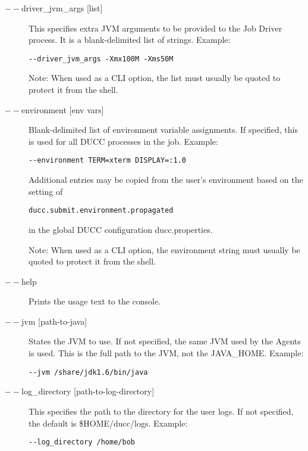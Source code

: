 \begin{description}
           \item[$--$driver\_jvm\_args {[list]} ]

             This specifies extra JVM arguments to be provided to the Job Driver process. It is a blank-delimited 
             list of strings. Example: 
             \begin{verbatim}
--driver_jvm_args -Xmx100M -Xms50M 
             \end{verbatim}

             Note: When used as a CLI option, the list must usually be
             quoted to protect it from the shell.

           \item[$--$environment {[env vars]}] Blank-delimited list of environment variable
             assignments. If specified, this is used for all DUCC processes in the job. Example:
\begin{verbatim}
--environment TERM=xterm DISPLAY=:1.0
\end{verbatim}
             
             Additional entries may be copied from the user's environment based on the setting of
\begin{verbatim}
ducc.submit.environment.propagated
\end{verbatim}
             in the global DUCC configuration ducc.properties.

             Note: When used as a CLI option, the environment string must usually be
             quoted to protect it from the shell.

           \item[$--$help ]

             Prints the usage text to the console. 

           \item[$--$jvm {[path-to-java]}  ]

             States the JVM to use. If not specified, the same JVM used by the Agents is used.  This is
             the full path to the JVM, not the JAVA\_HOME.
             Example: 
\begin{verbatim}
--jvm /share/jdk1.6/bin/java 
\end{verbatim}
             
           \item[$--$log\_directory {[path-to-log-directory]} ]

             This specifies the path to the directory for the user logs. If not specified, the default is
             \$HOME/ducc/logs. Example: 
             \begin{verbatim}
--log_directory /home/bob 
             \end{verbatim}
             

\end{description}
